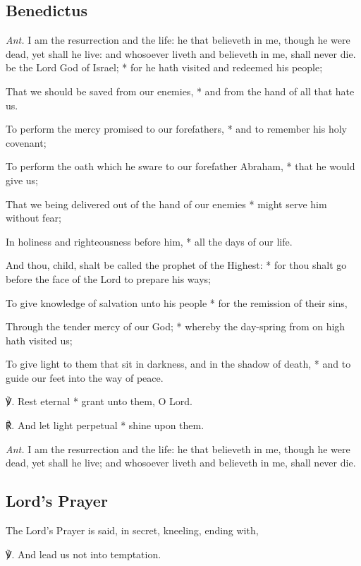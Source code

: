 \subsection{Benedictus}\par\noindent
\textit{Ant.} I am the resurrection {\dag} and the life: he that believeth in me, though he were dead, yet shall he live: and whosoever liveth and believeth in me, shall never die.
 {} be the Lord God of Israel; * for he hath visited and redeemed his people;\par
    That we should be saved from our enemies, * and from the hand of all that hate us.\par
    To perform the mercy promised to our forefathers, * and to remember his holy covenant;\par
    To perform the oath which he sware to our forefather Abraham, * that he would give us;\par
    That we being delivered out of the hand of our enemies * might serve him without fear;\par
    In holiness and righteousness before him, * all the days of our life.\par
    And thou, child, shalt be called the prophet of the Highest: * for thou shalt go before the face of the Lord to prepare his ways;\par
    To give knowledge of salvation unto his people * for the remission of their sins,\par
    Through the tender mercy of our God; * whereby the day-spring from on high hath visited us;\par
    To give light to them that sit in darkness, and in the shadow of death, * and to guide our feet into the way of peace.\par
    ℣. Rest eternal * grant unto them, O Lord.\par
    ℟. And let light perpetual * shine upon them.\par\noindent
\textit{Ant.} I am the resurrection and the life: he that believeth in me, though he were dead, yet shall he live; and whosoever liveth and believeth in me, shall never die.

\subsection{Lord's Prayer}
\begin{rubric}
The Lord's Prayer is said, in secret, kneeling, ending with,
\end{rubric}
℣. And lead us not into temptation.

